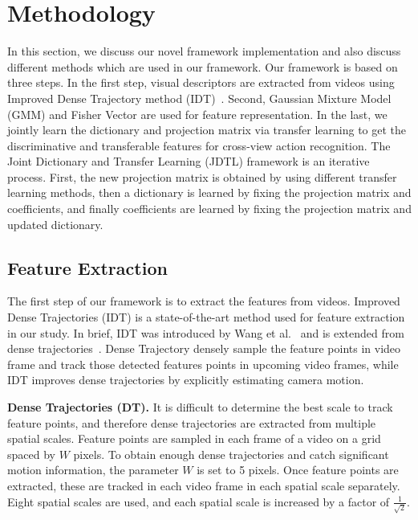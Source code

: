 \chapter{Methodology}
\label{methods}
In this section, we discuss our novel framework implementation and also discuss different methods which are used in our framework. Our framework is based on three steps. In the first step, visual descriptors are extracted from videos using Improved Dense Trajectory method (IDT)~\cite{wang2013action}. Second, Gaussian Mixture Model (GMM) and Fisher Vector are used for feature representation. In the last, we jointly learn the dictionary and projection matrix via transfer learning to get the discriminative and transferable features for cross-view action recognition. The Joint Dictionary and Transfer Learning (JDTL) framework is an iterative process. First, the new projection matrix is obtained by using different transfer learning methods, then a dictionary is learned by fixing the projection matrix and coefficients, and finally coefficients are learned by fixing the projection matrix and updated dictionary.

\section{Feature Extraction}
The first step of our framework is to extract the features from videos. Improved Dense Trajectories (IDT) is a state-of-the-art method used for feature extraction in our study. In brief, IDT was introduced by Wang et al.~\cite{wang2013action} and is extended from dense trajectories~\cite{wang2013dense,bilinski2014human}. Dense Trajectory densely sample the feature points in video frame and track those detected features points in upcoming video frames, while IDT improves dense trajectories by explicitly estimating camera motion. %

\noindent
\textbf{Dense Trajectories (DT). }
It is difficult to determine the best scale to track feature points, and therefore dense trajectories are extracted from multiple spatial scales. Feature points are sampled in each frame of a video on a grid spaced by ${W}$ pixels. To obtain enough dense trajectories and catch significant motion information, the parameter $W$ is set to 5 pixels. Once feature points are extracted, these are tracked in each video frame in each spatial scale separately. Eight spatial scales are used, and each spatial scale is increased by a factor of  $\frac{1}{\sqrt{2}}$. 

